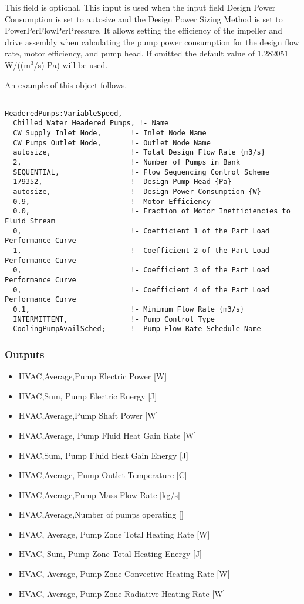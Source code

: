 This field is optional. This input is used when the input field Design Power Consumption is set to autosize and the Design Power Sizing Method is set to PowerPerFlowPerPressure. It allows setting the efficiency of the impeller and drive assembly when calculating the pump power consumption for the design flow rate, motor efficiency, and pump head. If omitted the default value of 1.282051 W/((m\(^{3}\)/s)-Pa) will be used.

An example of this object follows.

\begin{lstlisting}

HeaderedPumps:VariableSpeed,
  Chilled Water Headered Pumps, !- Name
  CW Supply Inlet Node,       !- Inlet Node Name
  CW Pumps Outlet Node,       !- Outlet Node Name
  autosize,                   !- Total Design Flow Rate {m3/s}
  2,                          !- Number of Pumps in Bank
  SEQUENTIAL,                 !- Flow Sequencing Control Scheme
  179352,                     !- Design Pump Head {Pa}
  autosize,                   !- Design Power Consumption {W}
  0.9,                        !- Motor Efficiency
  0.0,                        !- Fraction of Motor Inefficiencies to Fluid Stream
  0,                          !- Coefficient 1 of the Part Load Performance Curve
  1,                          !- Coefficient 2 of the Part Load Performance Curve
  0,                          !- Coefficient 3 of the Part Load Performance Curve
  0,                          !- Coefficient 4 of the Part Load Performance Curve
  0.1,                        !- Minimum Flow Rate {m3/s}
  INTERMITTENT,               !- Pump Control Type
  CoolingPumpAvailSched;      !- Pump Flow Rate Schedule Name
\end{lstlisting}

\subsubsection{Outputs}\label{outputs-4-011}

\begin{itemize}
\item
  HVAC,Average,Pump Electric Power {[}W{]}
\item
  HVAC,Sum, Pump Electric Energy {[}J{]}
\item
  HVAC,Average,Pump Shaft Power {[}W{]}
\item
  HVAC,Average, Pump Fluid Heat Gain Rate {[}W{]}
\item
  HVAC,Sum, Pump Fluid Heat Gain Energy {[}J{]}
\item
  HVAC,Average, Pump Outlet Temperature {[}C{]}
\item
  HVAC,Average,Pump Mass Flow Rate {[}kg/s{]}
\item
  HVAC,Average,Number of pumps operating {[]}
\item
  HVAC, Average, Pump Zone Total Heating Rate {[}W{]}
\item
  HVAC, Sum, Pump Zone Total Heating Energy {[}J{]}
\item
  HVAC, Average, Pump Zone Convective Heating Rate {[}W{]}
\item
  HVAC, Average, Pump Zone Radiative Heating Rate {[}W{]}
\end{itemize}

